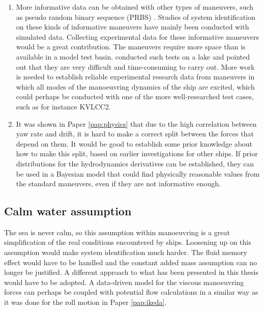 \begin{enumerate}[label=(\roman*),itemsep=1mm]
    
    \item More informative data can be obtained with other types of maneuvers, such as pseudo random binary sequence (PRBS) \cite{yoonIdentificationHydrodynamicCoefficients2003,wangOptimalDesignExcitation2020}. Studies of system identification on these kinds of informative maneuvers have mainly been conducted with simulated data. Collecting experimental data for these informative maneuvers would be a great contribution. The maneuvers require more space than is available in a model test basin. \textcite{millerShipModelIdentification2021} conducted such tests on a lake and pointed out that they are very difficult and time-consuming to carry out. 
More work is needed to establish reliable experimental research data from maneuvers in which all modes of the manoeuvring dynamics of the ship are excited, which could perhaps be conducted with one of the more well-researched test cases, such as for instance KVLCC2. 
    
    \item It was shown in Paper \ref{pap:physics} that due to the high correlation between yaw rate and drift, it is hard to make a correct split between the forces that depend on them. It would be good to establish some prior knowledge about how to make this split, based on earlier investigations for other ships. 
    If prior distributions for the hydrodynamics derivatives can be established, they can be used in a Bayesian model that could find physically reasonable values from the standard maneuvers, even if they are not informative enough.
\end{enumerate}

\subsection*{Calm water assumption}
The sea is never calm, so this assumption within manoeuvring is a great simplification of the real conditions encountered by ships. Loosening up on this assumption would make system identification much harder. The fluid memory effect would have to be handled and the constant added mass assumption can no longer be justified. A different approach to what has been presented in this thesis would have to be adopted. A data-driven model for the viscous manoeuvring forces can perhaps be coupled with potential flow calculations in a similar way as it was done for the roll motion in Paper \ref{pap:ikeda}.  
    
